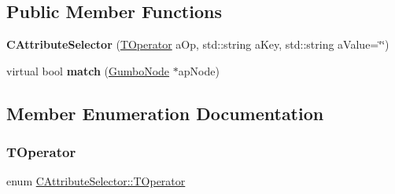 \subsection*{Public Member Functions}
\begin{DoxyCompactItemize}
\item 
\mbox{\label{class_c_attribute_selector_a42aba4080b85e73e38a0abc987c2beea}} 
{\bfseries C\+Attribute\+Selector} (\mbox{\hyperlink{class_c_attribute_selector_ae0950894fd715af728d5a5c4621bf44d}{T\+Operator}} a\+Op, std\+::string a\+Key, std\+::string a\+Value=\char`\"{}\char`\"{})
\item 
\mbox{\label{class_c_attribute_selector_a566f3cd29efcd57dce144d0073118431}} 
virtual bool {\bfseries match} (\mbox{\hyperlink{gumbo_8h_a5f67d8397fda8fb7c90cc27f14ac4e7d}{Gumbo\+Node}} $\ast$ap\+Node)
\end{DoxyCompactItemize}


\subsection{Member Enumeration Documentation}
\mbox{\label{class_c_attribute_selector_ae0950894fd715af728d5a5c4621bf44d}} 
\subsubsection{\texorpdfstring{T\+Operator}{TOperator}}
{\footnotesize\ttfamily enum \mbox{\hyperlink{class_c_attribute_selector_ae0950894fd715af728d5a5c4621bf44d}{C\+Attribute\+Selector\+::\+T\+Operator}}}

